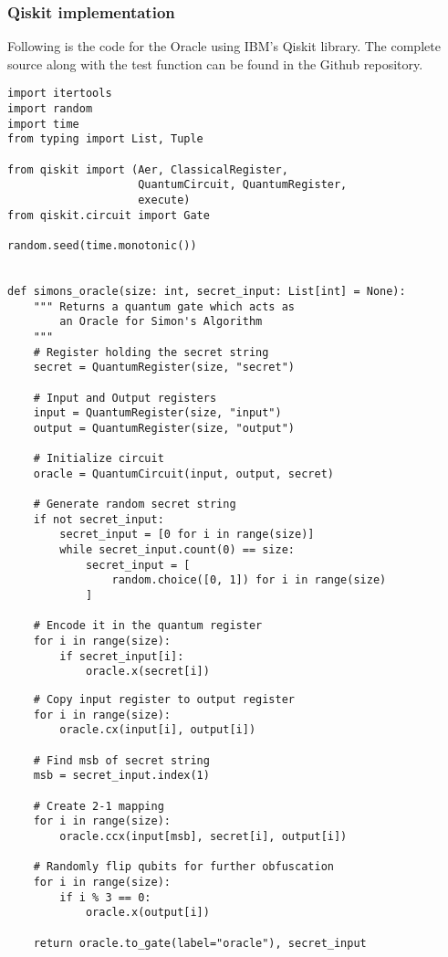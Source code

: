 \documentclass[13pt]{article}
\begin{document}
\subsubsection*{Qiskit implementation}
Following is the code for the Oracle using IBM's Qiskit library. The complete source along with the test function can be found in the Github repository.
\begin{tcolorbox}[
    enhanced,
    attach boxed title to top left={xshift=6mm,yshift=-3mm},
    title=Oracle Code,
    boxed title style={size=small,sharp corners},
    sharp corners,
]
\begin{verbatim}
import itertools
import random
import time
from typing import List, Tuple

from qiskit import (Aer, ClassicalRegister,
                    QuantumCircuit, QuantumRegister,
                    execute)
from qiskit.circuit import Gate

random.seed(time.monotonic())


def simons_oracle(size: int, secret_input: List[int] = None):
    """ Returns a quantum gate which acts as
        an Oracle for Simon's Algorithm
    """
    # Register holding the secret string
    secret = QuantumRegister(size, "secret")

    # Input and Output registers
    input = QuantumRegister(size, "input")
    output = QuantumRegister(size, "output")

    # Initialize circuit
    oracle = QuantumCircuit(input, output, secret)

    # Generate random secret string
    if not secret_input:
        secret_input = [0 for i in range(size)]
        while secret_input.count(0) == size:
            secret_input = [
                random.choice([0, 1]) for i in range(size)
            ]

    # Encode it in the quantum register
    for i in range(size):
        if secret_input[i]:
            oracle.x(secret[i])

\end{verbatim}
\end{tcolorbox}
\begin{tcolorbox}[
    enhanced,
    attach boxed title to top left={xshift=6mm,yshift=-3mm},
    title=Oracle Code,
    boxed title style={size=small,sharp corners},
    sharp corners,
]
\begin{verbatim}
    # Copy input register to output register
    for i in range(size):
        oracle.cx(input[i], output[i])

    # Find msb of secret string
    msb = secret_input.index(1)

    # Create 2-1 mapping
    for i in range(size):
        oracle.ccx(input[msb], secret[i], output[i])

    # Randomly flip qubits for further obfuscation
    for i in range(size):
        if i % 3 == 0:
            oracle.x(output[i])

    return oracle.to_gate(label="oracle"), secret_input
\end{verbatim}
\end{tcolorbox}
\end{document}
